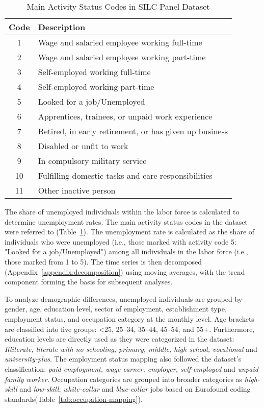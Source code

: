 \documentclass[a4paper,12pt]{article}
\begin{document}
\begin{table}[H]
\centering
\begin{tabular}{|c|l|}
\hline
\textbf{Code} & \textbf{Description} \\ \hline
1 & Wage and salaried employee working full-time \\ \hline
2 & Wage and salaried employee working part-time \\ \hline
3 & Self-employed working full-time \\ \hline
4 & Self-employed working part-time \\ \hline
5 & Looked for a job/Unemployed \\ \hline
6 & Apprentices, trainees, or unpaid work experience \\ \hline
7 & Retired, in early retirement, or has given up business \\ \hline
8 & Disabled or unfit to work \\ \hline
9 & In compulsory military service \\ \hline
10 & Fulfilling domestic tasks and care responsibilities \\ \hline
11 & Other inactive person \\ \hline
\end{tabular}
\caption{Main Activity Status Codes in SILC Panel Dataset}
\label{tab:activity-status}
\end{table}

The share of unemployed individuals within the labor force is calculated to determine unemployment rates. The main activity status codes in the dataset were referred to (Table~\ref{tab:activity-status}). The unemployment rate is calculated as the share of individuals who were unemployed (i.e., those marked with activity code 5: "Looked for a job/Unemployed") among all individuals in the labor force (i.e., those marked from 1 to 5).  The time series is then decomposed (Appendix~\ref{appendix:decomposition}) using moving averages, with the trend component forming the basis for subsequent analyses.



To analyze demographic differences, unemployed individuals are grouped by gender, age, education level, sector of employment, establishment type, employment status,  and occupation category at the monthly level. Age brackets are classified into five groups: \textless 25, 25--34, 35--44, 45--54, and 55+. Furthermore, education levels are directly used as they were categorized in the dataset: \textit{Illiterate, literate with no schooling, primary, middle, high school, vocational} and \textit{university-plus}. The employment status mapping also followed the dataset’s classification: \textit{paid employment, wage earner, employer, self-employed} and \textit{unpaid family worker}. Occupation categories are grouped into broader categories as \textit{high-skill} and \textit{low-skill}, \textit{white-collar} and \textit{blue-collar} jobs based on Eurofound coding standards(Table~\ref{tab:occupation-mapping}).
\end{document}
